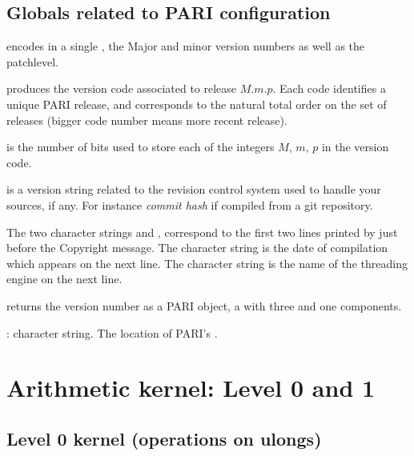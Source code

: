 \section{Globals related to PARI configuration}

\noindent {} encodes in a single , the Major
and minor version numbers as well as the patchlevel.

 produces the version code
associated to release $M.m.p$. Each code identifies a unique PARI release,
and corresponds to the natural total order on the set of releases (bigger
code number means more recent release).

\noindent {} is the number of bits used to store each of
the integers $M$, $m$, $p$ in the version code.

\noindent {} is a version string related to the
revision control system used to handle your sources, if any. For instance
\emph{commit hash} if compiled from a git repository.

The two character strings  and ,
correspond to the first two lines printed by  just before the
Copyright message. The character string  is the
date of compilation which appears on the next line. The character string
 is the name of the threading engine on the next line.

 returns the version number as a PARI object, a
 with three  and one  components.


: character string. The location of PARI's .

\newpage
\chapter{Arithmetic kernel: Level 0 and 1}

\section{Level 0 kernel (operations on ulongs)}

